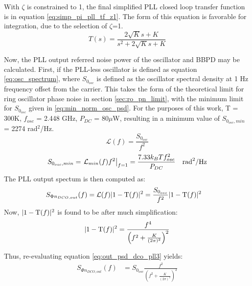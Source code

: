 			With $\zeta$ is constrained to 1, the final simplified PLL closed loop transfer function is in equation \ref{eq:simp_pi_pll_tf_z1}. The form of this equation is favorable for integration, due to the selection of $\zeta$=1.
			\begin{equation} \label{eq:simp_pi_pll_tf_z1}
				T(s) = \frac{2\sqrt{K}s + K }{s^2 + 2\sqrt{K}s + K}
			\end{equation}
			
			Now, the PLL output referred noise power of the oscillator and BBPD may be calculated. First, if the PLL-less oscillator is defined as equation \ref{eq:osc_spectrum}, where $S_{0_{osc}}$ is defined as the oscillator spectral density at 1 Hz frequency offset from the carrier. This takes the form of the theoretical limit for ring oscillator phase noise in section \ref{sec:ro_pn_limit}, with the minimum limit for $S_{0_{osc}}$ given in \ref{eq:min_norm_osc_psd}. For the purposes of this work, T = 300K, $f_{osc}$ = 2.448 GHz, $P_{DC}$ = 80$\mu$W, resulting in a minimum value of $S_{0_{osc},min}$ = 2274 rad$^2$/Hz. 
			\begin{equation}\label{eq:osc_spectrum} 
				\mathcal{L}(f) = \frac{S_{0_{osc}}}{f^2} 
			\end{equation} 
			\begin{equation}\label{eq:min_norm_osc_psd} 
				S_{0_{osc},min} = \left.\mathcal{L}_{min}(f)f^2\right|_{f=1} = \frac{7.33 k_B T f_{osc}^2}{P_{DC}} \hspace{1em}\textnormal{rad}^2/\textnormal{Hz}
			\end{equation}
			The PLL output spectum is then computed as: 
			\begin{align}\label{eq:out_psd_dco_pll3} 
				S_{\Phi n_{DCO,out}}(f) &= \mathcal{L}(f)|1-\textnormal{T}(f)|^2  =  \frac{S_{0_{osc}}}{f^2}|1-\textnormal{T}(f)|^2  
			\end{align} Now, $|1-\textnormal{T}(f)|^2$ is found to be after much simplification:
			\begin{equation} |1-\textnormal{T}(f)|^2 =
				\frac{f^4}{\left(f^2+\frac{K}{(2\pi)^2}\right)^2} 
			\end{equation} 

			Thus, re-evaluating equation \ref{eq:out_psd_dco_pll3} yields:
			\begin{align}\label{eq:out_psd_dco_pll4} 
				S_{\Phi n_{DCO,out}}(f) &= S_{0_{osc}}\frac{f^2}{\left(f^2+\frac{K}{(2\pi)^2}\right)^2} 
			\end{align} 

